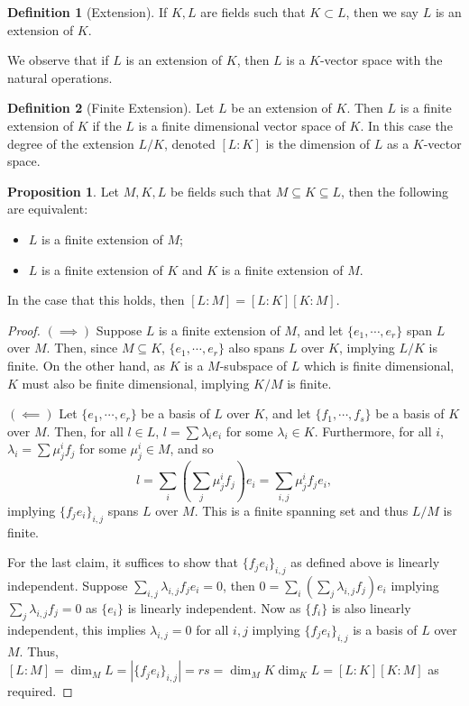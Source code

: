 \documentclass[]{article}
\theoremstyle{definition}
\theoremstyle{definition}
\newtheorem{definition}{Definition}[section]
\newtheorem{proposition}{Proposition}[section]
\begin{document}
\begin{definition}[Extension]
  If \(K, L\) are fields such that \(K \subset L\), then we say \(L\) is an 
  extension of \(K\).
\end{definition}

We observe that if \(L\) is an extension of \(K\), then \(L\) is a 
\(K\)-vector space with the natural operations.

\begin{definition}[Finite Extension]
  Let \(L\) be an extension of \(K\). Then \(L\) is a finite extension of \(K\) 
  if the \(L\) is a finite dimensional vector space of \(K\). In this case the 
  degree of the extension \(L / K\), denoted \([L : K]\) is the 
  dimension of \(L\) as a \(K\)-vector space.
\end{definition}

\begin{proposition}
  Let \(M, K, L\) be fields such that \(M \subseteq K \subseteq L\), then 
  the following are equivalent: 
  \begin{itemize}
    \item \(L\) is a finite extension of \(M\);
    \item \(L\) is a finite extension of \(K\) and \(K\) is a finite extension of 
      \(M\).
  \end{itemize}
  In the case that this holds, then \([L : M] = [L : K][K : M]\).
\end{proposition}
\begin{proof}
  \((\implies)\) Suppose \(L\) is a finite extension of \(M\), and let 
  \(\{e_1, \cdots, e_r\}\) span \(L\) over \(M\). Then, since \(M \subseteq K\), 
  \(\{e_1, \cdots, e_r\}\) also spans \(L\) over \(K\), implying 
  \(L / K\) is finite. On the other hand, as \(K\) is a \(M\)-subspace of 
  \(L\) which is finite dimensional, \(K\) must also be finite dimensional, 
  implying \(K / M\) is finite.

  \((\impliedby)\) Let \(\{e_1, \cdots, e_r\}\) be a basis of \(L\) over \(K\),
  and let \(\{f_1, \cdots, f_s\}\) be a basis of \(K\) over \(M\). Then, 
  for all \(l \in L\), \(l = \sum \lambda_i e_i\) for some \(\lambda_i \in K\).
  Furthermore, for all \(i\), \(\lambda_i = \sum \mu_j^i f_j\) for some 
  \(\mu_j^i \in M\), and so 
  \[l = \sum_i (\sum_j \mu_j^i f_j) e_i = \sum_{i,j} \mu_j^i f_j e_i,\]
  implying \(\{f_j e_i\}_{i, j}\) spans \(L\) over \(M\). This is a finite spanning 
  set and thus \(L / M\) is finite. 

  For the last claim, it suffices to show that \(\{f_j e_i\}_{i, j}\) as defined 
  above is linearly independent. Suppose 
  \(\sum_{i, j} \lambda_{i, j} f_j e_i = 0\), then 
  \(0 = \sum_i (\sum_j \lambda_{i, j} f_j) e_i\) implying 
  \(\sum_j \lambda_{i, j} f_j = 0\) as \(\{e_i\}\) is linearly independent. 
  Now as \(\{f_i\}\) is also linearly independent, this implies 
  \(\lambda_{i, j} = 0\) for all \(i, j\) implying \(\{f_j e_i\}_{i, j}\) 
  is a basis of \(L\) over \(M\). Thus, 
  \([L : M] = \dim_M L = |\{f_j e_i\}_{i, j}| = r s = \dim_M K \dim_K L = 
    [L : K][K : M]\) as required.
\end{proof}
\end{document}
